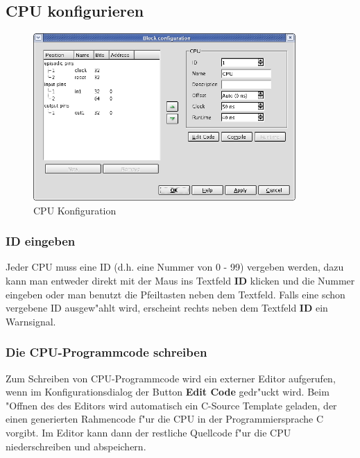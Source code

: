 \documentclass[a4paper,titlepage,12pt,ngerman]{scrbook}
\begin{document}
\subsection{CPU konfigurieren}
\begin{figure}[htbp]

\begin{center}

\includegraphics[width=10cm]{CPUConfiguration}

\caption{CPU Konfiguration}\label{test}

\end{center}

\end{figure}
\subsubsection{ID eingeben}
Jeder CPU muss eine ID (d.h. eine Nummer von 0 - 99) vergeben werden, dazu kann man entweder direkt mit der Maus ins Textfeld {\bf ID} klicken und die Nummer eingeben oder man benutzt die Pfeiltasten neben dem Textfeld. Falls eine schon vergebene ID ausgew"ahlt wird, erscheint rechts neben dem Textfeld {\bf ID} ein Warnsignal.

\subsubsection{Die CPU-Programmcode schreiben}
Zum Schreiben von CPU-Programmcode wird ein externer Editor aufgerufen, wenn im Konfigurationsdialog der Button {\bf Edit Code} gedr"uckt wird. Beim "Offnen des des Editors wird automatisch ein C-Source Template geladen, der einen generierten Rahmencode f"ur die CPU in der Programmiersprache C vorgibt. Im Editor kann dann der restliche Quellcode f"ur die CPU niederschreiben und abspeichern.
\end{document}
